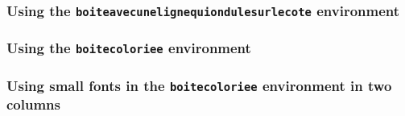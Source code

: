 \documentclass[a4paper,10pt]{article}
\begin{document}
\subsubsection*{Using the \texttt{boiteavecunelignequiondulesurlecote} environment}

\begin{Example}
  \begin{boiteavecunelignequiondulesurlecote}
    \lipsum[1-3]
  \end{boiteavecunelignequiondulesurlecote}
\end{Example}

\subsubsection*{Using the \texttt{boitecoloriee} environment}

\begin{Example}
  \bkcounttrue
  \begin{boitecoloriee}
    \lipsum[1-2]
  \end{boitecoloriee}
\end{Example}

\begin{Example}
  \begin{boitecoloriee}[green!20]
    \lipsum[1-2]
  \end{boitecoloriee}
\end{Example}

\begin{Example}
  \begin{boitecoloriee}[red!15]
    \lipsum[1]
    \begin{boitecoloriee}[yellow!25]
      \lipsum[2]
      \begin{boitecoloriee}[black!10]
        \lipsum[3]
      \end{boitecoloriee}
      \lipsum[4]
    \end{boitecoloriee}
    \lipsum[5]
  \end{boitecoloriee}
\end{Example}

\subsubsection*{Using small fonts in the \texttt{boitecoloriee} environment in two columns}

\begin{Example}
  \begin{multicols}{2}
    \begin{boitecoloriee}
      \small \lipsum[1-2]
    \end{boitecoloriee}
  \end{multicols}
\end{Example}
\end{document}
